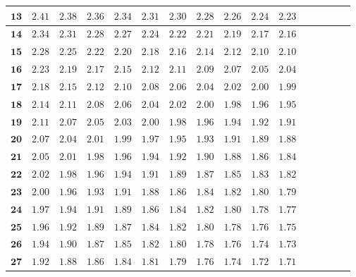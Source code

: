 \begin{longtable}{|r|r|r|r|r|r|r|r|r|r|r|r|r|r|r|r|}
    \(\mathbf{13}\)& \(2.41\) & \(2.38\) & \(2.36\) & \(2.34\) & \(2.31\) & \(2.30\) & \(2.28\) & \(2.26\) & \(2.24\) & \(2.23\) \\ \hline 
    \(\mathbf{14}\)& \(2.34\) & \(2.31\) & \(2.28\) & \(2.27\) & \(2.24\) & \(2.22\) & \(2.21\) & \(2.19\) & \(2.17\) & \(2.16\) \\ \hline 
    \(\mathbf{15}\)& \(2.28\) & \(2.25\) & \(2.22\) & \(2.20\) & \(2.18\) & \(2.16\) & \(2.14\) & \(2.12\) & \(2.10\) & \(2.10\) \\ \hline 
    \(\mathbf{16}\)& \(2.23\) & \(2.19\) & \(2.17\) & \(2.15\) & \(2.12\) & \(2.11\) & \(2.09\) & \(2.07\) & \(2.05\) & \(2.04\) \\ \hline 
    \(\mathbf{17}\)& \(2.18\) & \(2.15\) & \(2.12\) & \(2.10\) & \(2.08\) & \(2.06\) & \(2.04\) & \(2.02\) & \(2.00\) & \(1.99\) \\ \hline 
    \(\mathbf{18}\)& \(2.14\) & \(2.11\) & \(2.08\) & \(2.06\) & \(2.04\) & \(2.02\) & \(2.00\) & \(1.98\) & \(1.96\) & \(1.95\) \\ \hline 
    \(\mathbf{19}\)& \(2.11\) & \(2.07\) & \(2.05\) & \(2.03\) & \(2.00\) & \(1.98\) & \(1.96\) & \(1.94\) & \(1.92\) & \(1.91\) \\ \hline 
    \(\mathbf{20}\)& \(2.07\) & \(2.04\) & \(2.01\) & \(1.99\) & \(1.97\) & \(1.95\) & \(1.93\) & \(1.91\) & \(1.89\) & \(1.88\) \\ \hline 
    \(\mathbf{21}\)& \(2.05\) & \(2.01\) & \(1.98\) & \(1.96\) & \(1.94\) & \(1.92\) & \(1.90\) & \(1.88\) & \(1.86\) & \(1.84\) \\ \hline 
    \(\mathbf{22}\)& \(2.02\) & \(1.98\) & \(1.96\) & \(1.94\) & \(1.91\) & \(1.89\) & \(1.87\) & \(1.85\) & \(1.83\) & \(1.82\) \\ \hline 
    \(\mathbf{23}\)& \(2.00\) & \(1.96\) & \(1.93\) & \(1.91\) & \(1.88\) & \(1.86\) & \(1.84\) & \(1.82\) & \(1.80\) & \(1.79\) \\ \hline 
    \(\mathbf{24}\)& \(1.97\) & \(1.94\) & \(1.91\) & \(1.89\) & \(1.86\) & \(1.84\) & \(1.82\) & \(1.80\) & \(1.78\) & \(1.77\) \\ \hline 
    \(\mathbf{25}\)& \(1.96\) & \(1.92\) & \(1.89\) & \(1.87\) & \(1.84\) & \(1.82\) & \(1.80\) & \(1.78\) & \(1.76\) & \(1.75\) \\ \hline 
    \(\mathbf{26}\)& \(1.94\) & \(1.90\) & \(1.87\) & \(1.85\) & \(1.82\) & \(1.80\) & \(1.78\) & \(1.76\) & \(1.74\) & \(1.73\) \\ \hline 
    \(\mathbf{27}\)& \(1.92\) & \(1.88\) & \(1.86\) & \(1.84\) & \(1.81\) & \(1.79\) & \(1.76\) & \(1.74\) & \(1.72\) & \(1.71\) \\ \hline 

\end{longtable}
